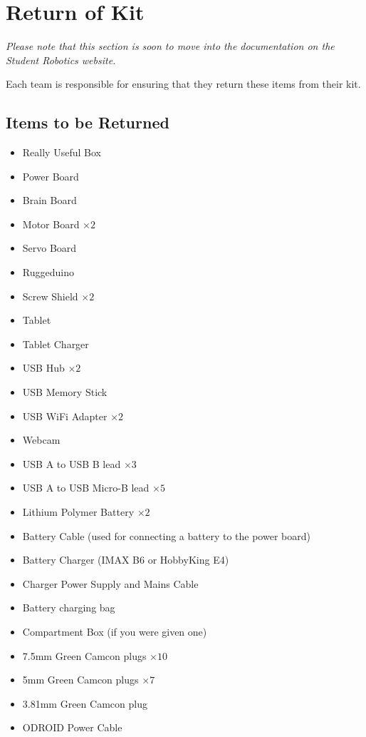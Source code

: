 \section {Return of Kit}
\label{sec:kit-return}

\textit{Please note that this section is soon to move into the documentation on the Student Robotics website.}

Each team is responsible for ensuring that they return these items from their kit.

\subsection {Items to be Returned}

\begin{itemize}
 \setlength{\itemsep}{0.3em}
 \item Really Useful Box

 \item Power Board
 \item Brain Board
 \item Motor Board $\times 2$
 \item Servo Board
 \item Ruggeduino
 \item Screw Shield $\times 2$

 \item Tablet
 \item Tablet Charger

 \item USB Hub $\times 2$
 \item USB Memory Stick
 \item USB WiFi Adapter $\times 2$
 \item Webcam
 \item USB A to USB B lead $\times 3$
 \item USB A to USB Micro-B lead $\times 5$

 \item Lithium Polymer Battery $\times 2$
 \item Battery Cable (used for connecting a battery to the power board)
 \item Battery Charger (IMAX B6 or HobbyKing E4)
 \item Charger Power Supply and Mains Cable
 \item Battery charging bag

 \item Compartment Box (if you were given one)
 \item 7.5mm Green Camcon plugs $\times 10$
 \item 5mm Green Camcon plugs $\times 7$
 \item 3.81mm Green Camcon plug
 \item ODROID Power Cable
\end{itemize}

